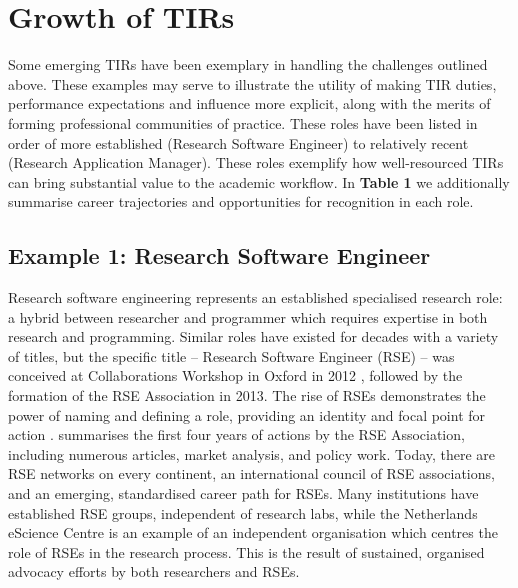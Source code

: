 \documentclass[authordate,meta,issue]{jote-new-article}
\begin{document}
\section{Growth of TIRs}



Some emerging TIRs have been exemplary in handling the challenges outlined above. These examples may serve to illustrate the utility of making TIR duties, performance expectations and influence more explicit, along with the merits of forming professional communities of practice. These roles have been listed in order of more established (Research Software Engineer) to relatively recent (Research Application Manager). These roles exemplify how well-resourced TIRs can bring substantial value to the academic workflow. In \textbf{Table 1} we additionally summarise career trajectories and opportunities for recognition in each role.



\subsection{Example 1: Research Software Engineer}



Research software engineering represents an established specialised research role: a hybrid between researcher and programmer which requires expertise in both research and programming. Similar roles have existed for decades with a variety of titles, but the specific title -- Research Software Engineer (RSE) -- was conceived at Collaborations Workshop in Oxford in 2012 \parencites{Hettrick2016}, followed by the formation of the RSE Association in 2013. The rise of RSEs demonstrates the power of naming and defining a role, providing an identity and focal point for action \parencites{Sims2021}. \textcite{Hettrick2016} summarises the first four years of actions by the RSE Association, including numerous articles, market analysis, and policy work. Today, there are RSE networks on every continent, an international council of RSE associations, and an emerging, standardised career path for RSEs. Many institutions have established RSE groups, independent of research labs, while the Netherlands eScience Centre is an example of an independent organisation which centres the role of RSEs in the research process. This is the result of sustained, organised advocacy efforts by both researchers and RSEs.
\end{document}
